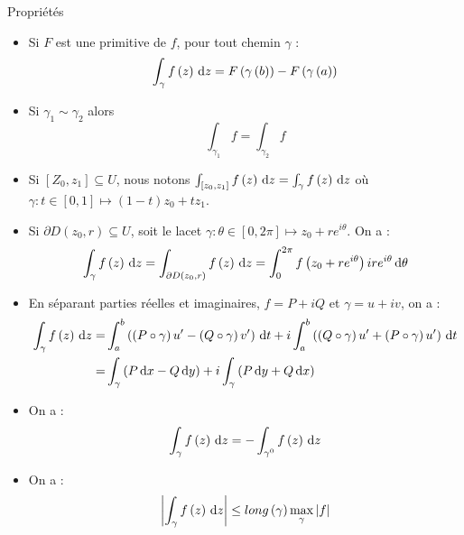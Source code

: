 \documentclass{cours}
\begin{document}
\begin{propositionfr}{Propriétés}{}
    \begin{itemize}
        \item Si $F$ est une primitive de $f$, pour tout chemin $\gamma$ : 
        \begin{equation*}
            \int_{\gamma}f\left(z\right){\rm \, d} z = F\left(\gamma\left(b\right)\right) - F\left(\gamma\left(a\right)\right)
        \end{equation*}
        \item Si $\gamma_{1} \sim \gamma_{2}$ alors 
        \begin{equation*}
            \int_{\gamma_{1}} f = \int_{\gamma_{2}} f
        \end{equation*}
        \item Si $\left[Z_{0}, z_{1}\right] \subseteq U$, nous notons $\int_{\left[z_{0}, z_{1}\right]} f\left(z\right){\rm \, d} z = \int_{\gamma}f\left(z\right){\rm \, d} z$ où $\gamma : t\in \left[0, 1\right] \mapsto \left(1 - t\right)z_{0} + tz_{1}$.
        \item Si $\partial D\left(z_{0}, r\right) \subseteq U$, soit le lacet $\gamma : \theta \in \left[0, 2\pi\right] \mapsto z_{0} + re^{i\theta}$. On a : 
        \begin{equation*}
            \int_{\gamma}f\left(z\right) {\rm \, d} z = \int_{\partial D\left(z_{0}, r\right)}f\left(z\right){\rm \, d} z = \int_{0}^{2\pi}f\left(z_{0} + re^{i\theta}\right)ire^{i\theta}{\rm \, d}\theta
        \end{equation*}
        \item En séparant parties réelles et imaginaires, $f = P + iQ$ et $\gamma = u + iv$, on a :
        \begin{equation*}
            \begin{aligned}
                \int_{\gamma}f\left(z\right) {\rm \, d} z = & \int_{a}^{b}\left(\left(P \circ \gamma\right)u' - \left(Q \circ \gamma\right)v'\right){\rm \, d} t + i \int_{a}^{b}\left(\left(Q \circ \gamma\right)u' + \left(P \circ \gamma\right)u'\right){\rm \, d} t\\
                = &\int_{\gamma}\left(P{\rm \, d} x - Q{\rm \, d} y\right) + i \int_{\gamma}\left(P{\rm \, d} y + Q {\rm \, d} x\right)
            \end{aligned}
        \end{equation*}
        \item On a :
        \begin{equation*}
            \int_{\gamma} f\left(z\right) {\rm \, d} z = - \int_{\gamma^{0}}f\left(z\right) {\rm \, d} z
        \end{equation*}
        \item On a :
        \begin{equation*}
            \left|\int_{\gamma}f\left(z\right){\rm \, d} z\right| \leq long\left(\gamma\right)\max_{\gamma}\left|f\right|
        \end{equation*} 
    \end{itemize}
\end{propositionfr}
\end{document}
